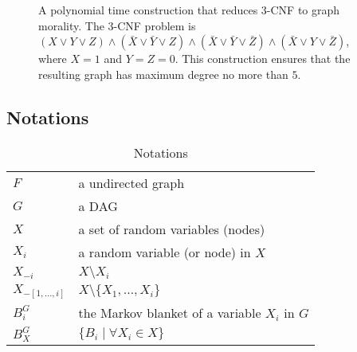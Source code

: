\begin{figure}[H]
\caption{A polynomial time construction that reduces 3-CNF to graph morality. The 3-CNF problem is $(X \vee Y \vee Z)\wedge(\bar{X} \vee \bar{Y} \vee Z)\wedge(\bar{X} \vee \bar{Y} \vee \bar{Z})\wedge(\bar{X} \vee Y \vee \bar{Z})$, where $X=1$ and $Y=Z=0$. This construction ensures that the resulting graph has maximum degree no more than $5$.}
\label{fg:3cnf}
\end{figure}


\subsection{Notations}
\begin{table}[]
\centering
\caption{Notations}
\label{my-label}
\begin{tabular}{ll}
\hline
$F$ &  a undirected graph \\
$G$ & a DAG \\
$X$ & a set of random variables (nodes) \\
$X_i$ & a random variable (or node) in $X$ \\
$X_{-i}$ & $X \setminus X_i$ \\ 
$X_{-[1,\dots, i]}$ & $X \setminus \{X_1, \dots, X_i\}$ \\ 
$B_i^G$ & the Markov blanket of a variable $X_i$ in $G$ \\ 
$B_X^G$ & $\{B_i \mid \forall X_i \in X\}$ \\ \hline
\end{tabular}
\end{table}




